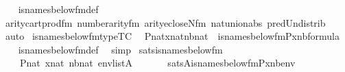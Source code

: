 \begin{isabellebody}
\ \ %
\endisadelimproof
%
\isatagproof
{}\isamarkupfalse%
\ is{\isacharunderscore}{\kern0pt}names{\isacharunderscore}{\kern0pt}below{\isacharunderscore}{\kern0pt}fm{\isacharunderscore}{\kern0pt}def\isanewline
\ \ \isamarkupfalse%
\ arity{\isacharunderscore}{\kern0pt}cartprod{\isacharunderscore}{\kern0pt}fm\ number{}arity{\isacharunderscore}{\kern0pt}{\isacharunderscore}{\kern0pt}fm\ arity{\isacharunderscore}{\kern0pt}ecloseN{\isacharunderscore}{\kern0pt}fm\ nat{\isacharunderscore}{\kern0pt}union{\isacharunderscore}{\kern0pt}abs{}\ pred{\isacharunderscore}{\kern0pt}Un{\isacharunderscore}{\kern0pt}distrib\isanewline
\ \ \isamarkupfalse%
\ auto%
\endisatagproof
{\isafoldproof}%
%
\isadelimproof
\isanewline
%
\endisadelimproof
\isanewline
\isanewline
{}\isamarkupfalse%
\ is{\isacharunderscore}{\kern0pt}names{\isacharunderscore}{\kern0pt}below{\isacharunderscore}{\kern0pt}fm{\isacharunderscore}{\kern0pt}type{\isacharbrackleft}{\kern0pt}TC{\isacharbrackright}{\kern0pt}{\isacharcolon}{\kern0pt}\isanewline
\ \ {\isachardoublequoteopen}{\isasymlbrakk}P{\isasymin}nat{\isacharsemicolon}{\kern0pt}x{\isasymin}nat{\isacharsemicolon}{\kern0pt}nb{\isasymin}nat{\isasymrbrakk}\ {\isasymLongrightarrow}\ is{\isacharunderscore}{\kern0pt}names{\isacharunderscore}{\kern0pt}below{\isacharunderscore}{\kern0pt}fm{\isacharparenleft}{\kern0pt}P{\isacharcomma}{\kern0pt}x{\isacharcomma}{\kern0pt}nb{\isacharparenright}{\kern0pt}{\isasymin}formula{\isachardoublequoteclose}\isanewline
%
\isadelimproof
\ \ %
\endisadelimproof
%
\isatagproof
{}\isamarkupfalse%
\ is{\isacharunderscore}{\kern0pt}names{\isacharunderscore}{\kern0pt}below{\isacharunderscore}{\kern0pt}fm{\isacharunderscore}{\kern0pt}def\ \isamarkupfalse%
\ simp%
\endisatagproof
{\isafoldproof}%
%
\isadelimproof
\isanewline
%
\endisadelimproof
\isanewline
{}\isamarkupfalse%
\ sats{\isacharunderscore}{\kern0pt}is{\isacharunderscore}{\kern0pt}names{\isacharunderscore}{\kern0pt}below{\isacharunderscore}{\kern0pt}fm\ {\isacharcolon}{\kern0pt}\isanewline
\ \ \isanewline
\ \ \ \ {\isachardoublequoteopen}P{\isasymin}nat{\isachardoublequoteclose}\ {\isachardoublequoteopen}x{\isasymin}nat{\isachardoublequoteclose}\ {\isachardoublequoteopen}nb{\isasymin}nat{\isachardoublequoteclose}\ {\isachardoublequoteopen}env{\isasymin}list{\isacharparenleft}{\kern0pt}A{\isacharparenright}{\kern0pt}{\isachardoublequoteclose}\isanewline
\ \ \isanewline
\ \ \ \ {\isachardoublequoteopen}sats{\isacharparenleft}{\kern0pt}A{\isacharcomma}{\kern0pt}is{\isacharunderscore}{\kern0pt}names{\isacharunderscore}{\kern0pt}below{\isacharunderscore}{\kern0pt}fm{\isacharparenleft}{\kern0pt}P{\isacharcomma}{\kern0pt}x{\isacharcomma}{\kern0pt}nb{\isacharparenright}{\kern0pt}{\isacharcomma}{\kern0pt}env{\isacharparenright}{\kern0pt}\isanewline

\end{isabellebody}
